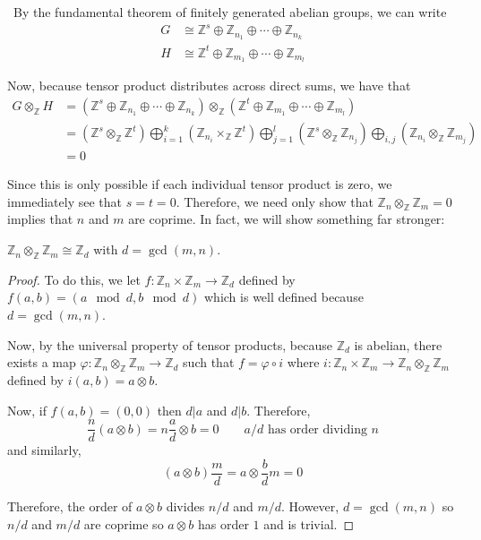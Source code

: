 \documentclass[12pt]{AlgebraQual}
\begin{document}
\begin{solution}$\,$
By the fundamental theorem of finitely generated abelian groups, we can write \begin{align*}
    G&\cong\mathbb{Z}^s\oplus\mathbb{Z}_{n_1}\oplus\cdots\oplus\mathbb{Z}_{n_k}\\
    H&\cong\mathbb{Z}^t\oplus\mathbb{Z}_{m_1}\oplus\cdots\oplus\mathbb{Z}_{m_l}
\end{align*}

Now, because tensor product distributes across direct sums, we have that \begin{align*}
    G\otimes_\mathbb{Z}H&=(\mathbb{Z}^s\oplus\mathbb{Z}_{n_1}\oplus\cdots\oplus\mathbb{Z}_{n_k})\otimes_\mathbb{Z}(\mathbb{Z}^t\oplus\mathbb{Z}_{m_1}\oplus\cdots\oplus\mathbb{Z}_{m_l})\\
    &=(\mathbb{Z}^s\otimes_\mathbb{Z}\mathbb{Z}^t)\bigoplus_{i=1}^k(\mathbb{Z}_{n_i}\times_{\mathbb{Z}}\mathbb{Z}^t)\bigoplus_{j=1}^l(\mathbb{Z}^s\otimes_\mathbb{Z}\mathbb{Z}_{n_j})\bigoplus_{i,j}(\mathbb{Z}_{n_i}\otimes_\mathbb{Z}\mathbb{Z}_{m_j})\\
    &=0
\end{align*}

Since this is only possible if each individual tensor product is zero, we immediately see that $s=t=0$. Therefore, we need only show that $\mathbb{Z}_n\otimes_\mathbb{Z}\mathbb{Z}_m=0$ implies that $n$ and $m$ are coprime. In fact, we will show something far stronger:

\begin{claim} $\mathbb{Z}_n\otimes_\mathbb{Z}\mathbb{Z}_m\cong\mathbb{Z}_d$ with $d=\gcd(m,n)$.
\begin{proof} To do this, we let $f:\mathbb{Z}_n\times\mathbb{Z}_m\to\mathbb{Z}_d$ defined by $f(a,b)=(a\mod d,b\mod d)$ which is well defined because $d=\gcd(m,n)$.

Now, by the universal property of tensor products, because $\mathbb{Z}_d$ is abelian, there exists a map $\varphi:\mathbb{Z}_n\otimes_\mathbb{Z}\mathbb{Z}_m\to\mathbb{Z}_d$ such that $f=\varphi\circ i$ where $i:\mathbb{Z}_n\times\mathbb{Z}_m\to \mathbb{Z}_n\otimes_\mathbb{Z}\mathbb{Z}_m$ defined by $i(a,b)=a\otimes b$.

Now, if $f(a,b)=(0,0)$ then $d|a$ and $d|b$. Therefore, $$\frac{n}{d}(a\otimes b)=n\frac{a}{d}\otimes b=0\qquad a/d\text{ has order dividing }n$$ and similarly, $$(a\otimes b)\frac{m}{d}=a\otimes \frac{b}{d}m=0$$

Therefore, the order of $a\otimes b$ divides $n/d$ and $m/d$. However, $d=\gcd(m,n)$ so $n/d$ and $m/d$ are coprime so $a\otimes b$ has order $1$ and is trivial.


\end{proof}
\end{claim}
\end{solution}
\end{document}
